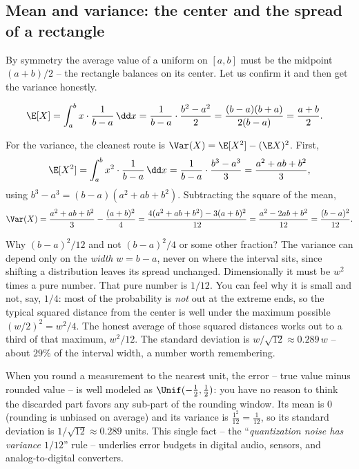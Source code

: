 \subsection{Mean and variance: the center and the spread of a rectangle}

By symmetry the average value of a uniform on $[a,b]$ must be the midpoint
$(a+b)/2$ -- the rectangle balances on its center. Let us confirm it and then
get the variance honestly.

\begin{align*}
  \E[X] &= \int_a^b x\cdot\frac{1}{b-a}\,\dd x
         = \frac{1}{b-a}\cdot\frac{b^2-a^2}{2}
         = \frac{(b-a)(b+a)}{2(b-a)} = \frac{a+b}{2}.
\end{align*}

For the variance, the cleanest route is $\Var(X) = \E[X^2] - (\E X)^2$. First,
\[
  \E[X^2] = \int_a^b x^2\cdot\frac{1}{b-a}\,\dd x
          = \frac{1}{b-a}\cdot\frac{b^3-a^3}{3}
          = \frac{a^2+ab+b^2}{3},
\]
using $b^3-a^3 = (b-a)(a^2+ab+b^2)$. Subtracting the square of the mean,
\[
  \Var(X) = \frac{a^2+ab+b^2}{3} - \frac{(a+b)^2}{4}
          = \frac{4(a^2+ab+b^2) - 3(a+b)^2}{12}
          = \frac{a^2 - 2ab + b^2}{12} = \frac{(b-a)^2}{12}.
\]

\begin{whybox}
Why $(b-a)^2/12$ and not $(b-a)^2/4$ or some other fraction? The variance can
depend only on the \emph{width} $w=b-a$, never on where the interval sits, since
shifting a distribution leaves its spread unchanged. Dimensionally it must be
$w^2$ times a pure number. That pure number is $1/12$. You can feel why it is
small and not, say, $1/4$: most of the probability is \emph{not} out at the
extreme ends, so the typical squared distance from the center is well under the
maximum possible $(w/2)^2 = w^2/4$. The honest average of those squared
distances works out to a third of that maximum, $w^2/12$. The standard
deviation is $w/\sqrt{12} \approx 0.289\,w$ -- about $29\%$ of the interval
width, a number worth remembering.
\end{whybox}

\begin{example}
\label{ch11:ex-rounding}
When you round a measurement to the nearest unit, the error -- true value minus
rounded value -- is well modeled as $\Unif(-\tfrac12,\tfrac12)$: you have no
reason to think the discarded part favors any sub-part of the rounding window.
Its mean is $0$ (rounding is unbiased on average) and its variance is
$\frac{1^2}{12} = \frac{1}{12}$, so its standard deviation is
$1/\sqrt{12} \approx 0.289$ units. This single fact -- the
``\emph{quantization noise has variance $1/12$}'' rule -- underlies error
budgets in digital audio, sensors, and analog-to-digital converters.
\end{example}

